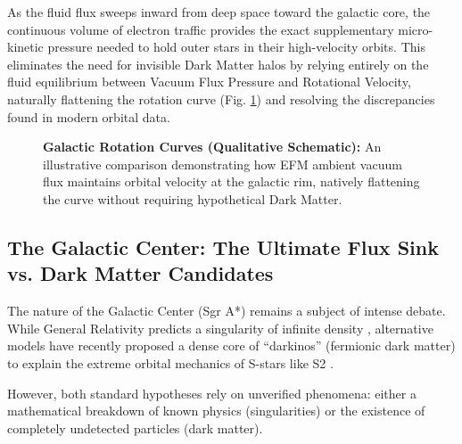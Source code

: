 \documentclass[11pt, a4paper]{article}
\begin{document}
  As the fluid flux sweeps inward from deep space toward the galactic core, the continuous volume of electron traffic provides the exact supplementary micro-kinetic pressure needed to hold outer stars in their high-velocity orbits. This eliminates the need for invisible Dark Matter halos by relying entirely on the fluid equilibrium between Vacuum Flux Pressure and Rotational Velocity, naturally flattening the rotation curve (Fig. \ref{fig:rotation_curve}) and resolving the discrepancies found in modern orbital data.

\begin{figure}[!ht]
\centering
{}
\caption{\textbf{Galactic Rotation Curves (Qualitative Schematic):} An illustrative comparison demonstrating how EFM ambient vacuum flux maintains orbital velocity at the galactic rim, natively flattening the curve without requiring hypothetical Dark Matter.}
\label{fig:rotation_curve}
\end{figure}

\subsection{The Galactic Center: The Ultimate Flux Sink vs. Dark Matter Candidates}

  The nature of the Galactic Center (Sgr A*) remains a subject of intense debate. While General Relativity predicts a singularity of infinite density \cite{Gravity2020}, alternative models have recently proposed a dense core of ``darkinos'' (fermionic dark matter) to explain the extreme orbital mechanics of S-stars like S2 \cite{BecerraVergara2021}. 

  However, both standard hypotheses rely on unverified phenomena: either a mathematical breakdown of known physics (singularities) or the existence of completely undetected particles (dark matter).
\end{document}
